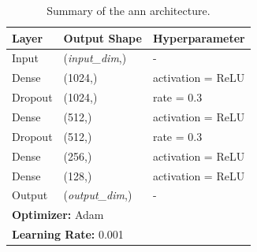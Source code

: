 \FloatBarrier

\begin{table}[!htb]
  \centering
  \begin{tabular}{lll}
    \toprule
    \textbf{Layer} & \textbf{Output Shape} & \textbf{Hyperparameter} \\ \midrule
    Input & (\textit{input\_dim},) & - \\
    Dense & (1024,) & activation = ReLU \\
    Dropout & (1024,) & rate = 0.3 \\
    Dense & (512,) & activation = ReLU \\
    Dropout & (512,) & rate = 0.3 \\
    Dense & (256,) & activation = ReLU \\
    Dense & (128,) & activation = ReLU \\
    Output & (\textit{output\_dim},) & - \\
    \midrule
    \multicolumn{3}{l}{\textbf{Optimizer:} Adam} \\
    \multicolumn{3}{l}{\textbf{Learning Rate:} 0.001} \\
    \bottomrule
  \end{tabular}
  \caption{Summary of the \gls{ann} architecture.}
  \label{tab:nn_architecture}
\end{table}

\FloatBarrier

